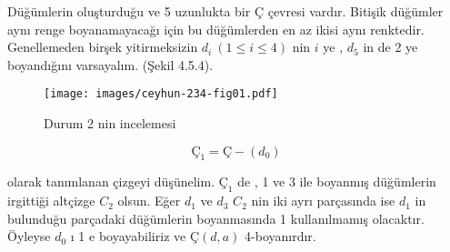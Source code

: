 \documentclass[11pt]{amsbook}
\begin{document}

Düğümlerin oluşturduğu ve 5 uzunlukta bir Ç çevresi vardır. Bitişik düğümler aynı renge boyanamayacağı için bu düğümlerden en az ikisi aynı renktedir. Genellemeden birşek yitirmeksizin $d_i \ (1\leq i \leq 4)$ nin $i$ ye , $d_5$ in de 2 ye boyandığını varsayalım. (Şekil 4.5.4).

\begin{figure}[htb]
	\centering
	\texttt{[image: images/ceyhun-234-fig01.pdf]}
	\caption{Durum 2 nin incelemesi}
\end{figure}

\[ Ç_1 = Ç - (d_0)\]

olarak tanımlanan çizgeyi düşünelim. $Ç_1$ de , 1 ve 3 ile boyanmış düğümlerin irgittiği altçizge $C_2$ olsun. Eğer $d_1 $ ve $d_3$ $C_2$ nin iki ayrı parçasında ise $d_1$ in bulunduğu parçadaki düğümlerin boyanmasında 1 kullanılmamış olacaktır. Öyleyse $d_0$ ı 1 e boyayabiliriz ve $Ç(d,a)$ 4-boyanırdır.
\end{document}
